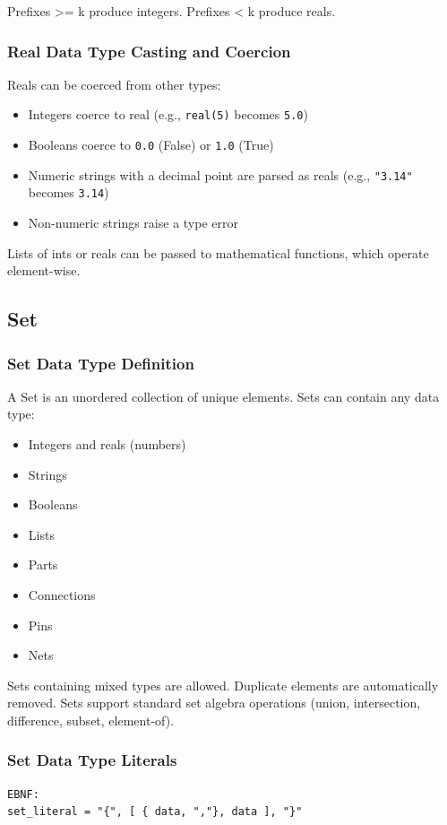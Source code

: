 \documentclass{report}
\begin{document}
Prefixes >= k produce integers. Prefixes < k produce reals.

\subsubsection{Real Data Type Casting and Coercion}
Reals can be coerced from other types:
\begin{itemize}
\item Integers coerce to real (e.g., \texttt{real(5)} becomes \texttt{5.0})
\item Booleans coerce to \texttt{0.0} (False) or \texttt{1.0} (True)
\item Numeric strings with a decimal point are parsed as reals (e.g., \texttt{"3.14"} becomes \texttt{3.14})
\item Non-numeric strings raise a type error
\end{itemize}
Lists of ints or reals can be passed to mathematical functions, which operate element-wise.
\subsection{Set}
\subsubsection{Set Data Type Definition}
A Set is an unordered collection of unique elements. Sets can contain any data type:
\begin{itemize}
\item Integers and reals (numbers)
\item Strings
\item Booleans
\item Lists
\item Parts
\item Connections
\item Pins
\item Nets
\end{itemize}

Sets containing mixed types are allowed. Duplicate elements are automatically removed. Sets support standard set algebra operations (union, intersection, difference, subset, element-of).

\subsubsection{Set Data Type Literals}
\begin{verbatim}
EBNF:
set_literal = "{", [ { data, ","}, data ], "}"
\end{verbatim}
\end{document}
